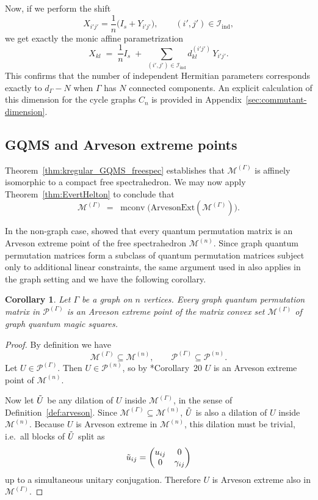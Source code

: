 \documentclass[11pt, a4paper]{article}
\theoremstyle{plain}
\newtheorem{corollary}[theorem]{Corollary}
\theoremstyle{definition}
\theoremstyle{remark}
\begin{document}
Now, if we perform the shift
\[
X_{i'j'} = \frac{1}{n}\bigl(I_s + Y_{i'j'}\bigr),
\qquad (i',j')\in \mathcal{I}_{\mathrm{ind}},
\]
we get exactly the monic affine parametrization
\begin{equation}\label{eq:GQMS_affine_parametrization}
X_{kl} \;=\; \frac{1}{n} I_s
  \;+\; \sum_{(i',j')\in \mathcal{I}_{\mathrm{ind}}} d_{kl}^{(i'j')} \, Y_{i'j'}.
\end{equation}
This confirms that the number of independent Hermitian parameters corresponds exactly to \(d_\Gamma - N\) when \(\Gamma\) has \(N\) connected components. An explicit calculation of this dimension for the cycle graphs \(C_n\) is provided in Appendix~\ref{sec:commutant-dimension}.



\subsection{GQMS and Arveson extreme points}
Theorem~\ref{thm:kregular_GQMS_freespec} establishes that
\(\mathcal{M}^{(\Gamma)}\) is affinely isomorphic to a compact free spectrahedron. We may now apply Theorem~\ref{thm:EvertHelton} to conclude that
\[
\mathcal{M}^{(\Gamma)}
\;=\;
\operatorname{mconv}\bigl(
\mathrm{ArvesonExt}(\mathcal{M}^{(\Gamma)})
\bigr).
\]

In the non-graph case, \cite{DDN20} showed that every quantum
permutation matrix is an Arveson extreme point of the free spectrahedron
\(\mathcal{M}^{(n)}\).
Since graph quantum permutation matrices form a subclass of
quantum permutation matrices subject only to additional linear constraints,
the same argument used in \cite{DDN20} also applies
in the graph setting and we have the following corollary.

\begin{corollary}\label{cor:graph-arveson}
Let \(\Gamma\) be a graph on \(n\) vertices.
Every graph quantum permutation matrix in \(\mathcal{P}^{(\Gamma)}\)
is an Arveson extreme point of the matrix convex set
\(\mathcal{M}^{(\Gamma)}\) of graph quantum magic squares.
\end{corollary}
\begin{proof}
By definition we have
\[
\mathcal{M}^{(\Gamma)} \subseteq \mathcal{M}^{(n)}, 
\qquad 
\mathcal{P}^{(\Gamma)} \subseteq \mathcal{P}^{(n)}.
\]
Let \(U \in \mathcal{P}^{(\Gamma)}\). 
Then \(U \in \mathcal{P}^{(n)}\), so by 
\cite{DDN20}*{Corollary~20}
\(U\) is an Arveson extreme point of \(\mathcal{M}^{(n)}\).

Now let \(\Tilde{U}\) be any dilation of \(U\) inside \(\mathcal{M}^{(\Gamma)}\), 
in the sense of Definition~\ref{def:arveson}.
Since \(\mathcal{M}^{(\Gamma)} \subseteq \mathcal{M}^{(n)}\), 
\(\Tilde{U}\) is also a dilation of \(U\) inside \(\mathcal{M}^{(n)}\).
Because \(U\) is Arveson extreme in \(\mathcal{M}^{(n)}\), 
this dilation must be trivial, i.e.\ all blocks of \(\Tilde{U}\) split as
\[
\Tilde{u}_{ij} =
\begin{pmatrix}
u_{ij} & 0 \\
0      & \gamma_{ij}
\end{pmatrix}
\]
up to a simultaneous unitary conjugation.
Therefore \(U\) is Arveson extreme also in \(\mathcal{M}^{(\Gamma)}\).
\end{proof}
\end{document}
